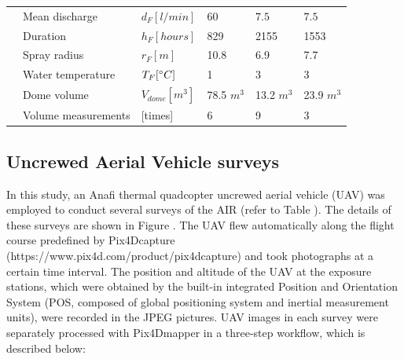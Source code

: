 \documentclass[utf8]{frontiersSCNS} %
\begin{document}
\begin{table}
\begin{tabular}{@{}|llllll|@{}}
		\multicolumn{1}{|l|}{\multirow{4}{*}{\rotatebox[origin=c]{90}{Fountain}}}
		                       & Mean discharge              & $d_F [l/min]     $        & $60$          & $7.5$         & $7.5$         \\
		\multicolumn{1}{|l|}{} & Duration                    & $h_F [hours]$             & 829           & 2155          & 1553          \\
		\multicolumn{1}{|l|}{} & Spray radius                & $r_{F} [m]$               & 10.8          & 6.9           & 7.7           \\
		\multicolumn{1}{|l|}{} & Water temperature           & $T_{F} [\degree C]$       & 1             & 3             & 3             \\\midrule
		\multicolumn{1}{|l|}{\multirow{2}{*}{\rotatebox[origin=c]{90}{UAV}}}
		                       & Dome volume                 & $V_{dome}[m^{3}]$         & 78.5 $m^{3}$  & 13.2 $m^{3}$  & 23.9 $m^{3}$  \\
		\multicolumn{1}{|l|}{} & Volume measurements         & [times]                   & 6             & 9             & 3
		\\\bottomrule
	\end{tabular}
\end{table}

\subsection{Uncrewed Aerial Vehicle surveys}

In this study, an Anafi thermal quadcopter uncrewed aerial vehicle (UAV) was employed to conduct several surveys of the
AIR (refer to Table ).  The details of these surveys are shown in Figure . The UAV flew automatically along the flight
course predefined by Pix4Dcapture (https://www.pix4d.com/product/pix4dcapture) and took photographs at a certain time
interval. The position and altitude of the UAV at the exposure stations, which were obtained by the built-in integrated
Position and Orientation System (POS, composed of global positioning system and inertial measurement units), were
recorded in the JPEG pictures. UAV images in each survey were separately processed with Pix4Dmapper in a three-step
workflow, which is described below:
\end{document}
